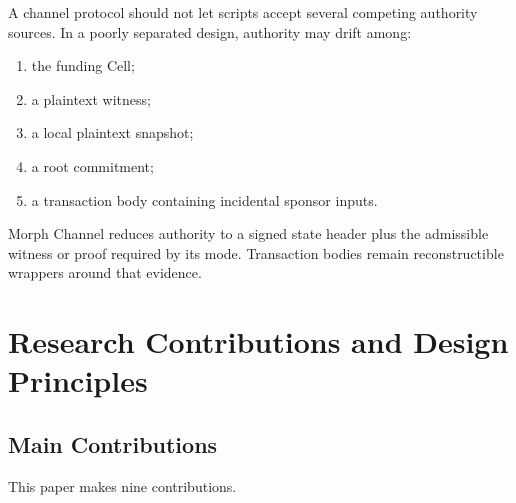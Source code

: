\documentclass[a4paper,11pt]{article}
\begin{document}
A channel protocol should not let scripts accept several competing authority sources. In a poorly separated design, authority may drift among:
\begin{enumerate}[label=(\arabic*)]
  \item the funding Cell;
  \item a plaintext witness;
  \item a local plaintext snapshot;
  \item a root commitment;
  \item a transaction body containing incidental sponsor inputs.
\end{enumerate}

Morph Channel reduces authority to a signed state header plus the admissible witness or proof required by its mode. Transaction bodies remain reconstructible wrappers around that evidence.

\clearpage
\section{Research Contributions and Design Principles}

\subsection{Main Contributions}

This paper makes nine contributions.
\end{document}
